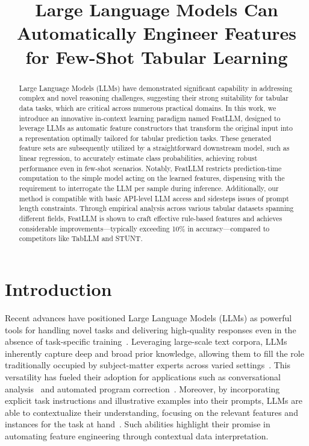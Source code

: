 \title{Large Language Models Can Automatically Engineer Features for Few-Shot Tabular Learning}

\begin{abstract}
Large Language Models (LLMs) have demonstrated significant capability in addressing complex and novel reasoning challenges, suggesting their strong suitability for tabular data tasks, which are critical across numerous practical domains. In this work, we introduce an innovative in-context learning paradigm named \textsf{FeatLLM}, designed to leverage LLMs as automatic feature constructors that transform the original input into a representation optimally tailored for tabular prediction tasks. These generated feature sets are subsequently utilized by a straightforward downstream model, such as linear regression, to accurately estimate class probabilities, achieving robust performance even in few-shot scenarios. Notably, \textsf{FeatLLM} restricts prediction-time computation to the simple model acting on the learned features, dispensing with the requirement to interrogate the LLM per sample during inference. Additionally, our method is compatible with basic API-level LLM access and sidesteps issues of prompt length constraints. Through empirical analysis across various tabular datasets spanning different fields, \textsf{FeatLLM} is shown to craft effective rule-based features and achieves considerable improvements—typically exceeding 10\% in accuracy—compared to competitors like TabLLM and STUNT.
\end{abstract}

\section{Introduction}
Recent advances have positioned Large Language Models (LLMs) as powerful tools for handling novel tasks and delivering high-quality responses even in the absence of task-specific training~\cite{creswell2022selection,imani2023mathprompter,taylor2022galactica}. Leveraging large-scale text corpora, LLMs inherently capture deep and broad prior knowledge, allowing them to fill the role traditionally occupied by subject-matter experts across varied settings~\cite{Genomes2021,singhal2023large,wilcox2003role}. This versatility has fueled their adoption for applications such as conversational analysis~\cite{finch2023leveraging} and automated program correction~\cite{fan2023automated}. Moreover, by incorporating explicit task instructions and illustrative examples into their prompts, LLMs are able to contextualize their understanding, focusing on the relevant features and instances for the task at hand~\cite{brown2020language,zhao2023survey}. Such abilities highlight their promise in automating feature engineering through contextual data interpretation.

